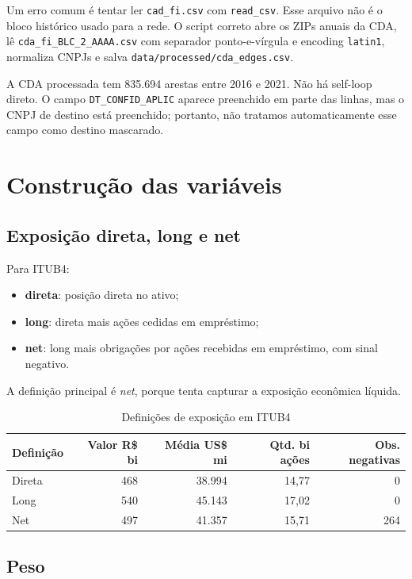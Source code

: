 \documentclass[11pt,a4paper]{article}
\begin{document}
Um erro comum é tentar ler \texttt{cad\_fi.csv} com \texttt{read\_csv}. Esse arquivo não é o bloco histórico
usado para a rede. O script correto abre os ZIPs anuais da CDA, lê \texttt{cda\_fi\_BLC\_2\_AAAA.csv} com
separador ponto-e-vírgula e encoding \texttt{latin1}, normaliza CNPJs e salva
\texttt{data/processed/cda\_edges.csv}.

A CDA processada tem 835.694 arestas entre 2016 e 2021. Não há self-loop direto. O campo
\texttt{DT\_CONFID\_APLIC} aparece preenchido em parte das linhas, mas o CNPJ de destino está preenchido;
portanto, não tratamos automaticamente esse campo como destino mascarado.

\section{Construção das variáveis}

\subsection{Exposição direta, long e net}

Para ITUB4:
\begin{itemize}
\item \textbf{direta}: posição direta no ativo;
\item \textbf{long}: direta mais ações cedidas em empréstimo;
\item \textbf{net}: long mais obrigações por ações recebidas em empréstimo, com sinal negativo.
\end{itemize}

A definição principal é \emph{net}, porque tenta capturar a exposição econômica líquida.

\begin{table}[H]\centering
\caption{Definições de exposição em ITUB4}
\small
\begin{tabular}{lrrrr}
\toprule
Definição & Valor R\$ bi & Média US\$ mi & Qtd. bi ações & Obs. negativas \\
\midrule
Direta & 468 & 38.994 & 14,77 & 0 \\
Long & 540 & 45.143 & 17,02 & 0 \\
Net & 497 & 41.357 & 15,71 & 264 \\
\bottomrule
\end{tabular}
\end{table}

\subsection{Peso}
\end{document}
